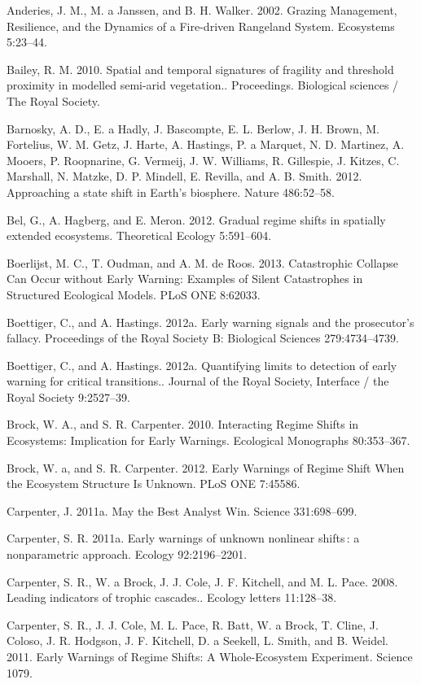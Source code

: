 \documentclass{article}
\begin{document}
Anderies, J. M., M. a Janssen, and B. H. Walker. 2002. Grazing
Management, Resilience, and the Dynamics of a Fire-driven Rangeland
System. Ecosystems 5:23--44.

Bailey, R. M. 2010. Spatial and temporal signatures of fragility and
threshold proximity in modelled semi-arid vegetation.. Proceedings.
Biological sciences / The Royal Society.

Barnosky, A. D., E. a Hadly, J. Bascompte, E. L. Berlow, J. H. Brown, M.
Fortelius, W. M. Getz, J. Harte, A. Hastings, P. a Marquet, N. D.
Martinez, A. Mooers, P. Roopnarine, G. Vermeij, J. W. Williams, R.
Gillespie, J. Kitzes, C. Marshall, N. Matzke, D. P. Mindell, E. Revilla,
and A. B. Smith. 2012. Approaching a state shift in Earth's biosphere.
Nature 486:52--58.

Bel, G., A. Hagberg, and E. Meron. 2012. Gradual regime shifts in
spatially extended ecosystems. Theoretical Ecology 5:591--604.

Boerlijst, M. C., T. Oudman, and A. M. de Roos. 2013. Catastrophic
Collapse Can Occur without Early Warning: Examples of Silent
Catastrophes in Structured Ecological Models. PLoS ONE 8:62033.

Boettiger, C., and A. Hastings. 2012a. Early warning signals and the
prosecutor's fallacy. Proceedings of the Royal Society B: Biological
Sciences 279:4734--4739.

Boettiger, C., and A. Hastings. 2012a. Quantifying limits to detection
of early warning for critical transitions.. Journal of the Royal
Society, Interface / the Royal Society 9:2527--39.

Brock, W. A., and S. R. Carpenter. 2010. Interacting Regime Shifts in
Ecosystems: Implication for Early Warnings. Ecological Monographs
80:353--367.

Brock, W. a, and S. R. Carpenter. 2012. Early Warnings of Regime Shift
When the Ecosystem Structure Is Unknown. PLoS ONE 7:45586.

Carpenter, J. 2011a. May the Best Analyst Win. Science 331:698--699.

Carpenter, S. R. 2011a. Early warnings of unknown nonlinear shifts : a
nonparametric approach. Ecology 92:2196--2201.

Carpenter, S. R., W. a Brock, J. J. Cole, J. F. Kitchell, and M. L.
Pace. 2008. Leading indicators of trophic cascades.. Ecology letters
11:128--38.

Carpenter, S. R., J. J. Cole, M. L. Pace, R. Batt, W. a Brock, T. Cline,
J. Coloso, J. R. Hodgson, J. F. Kitchell, D. a Seekell, L. Smith, and B.
Weidel. 2011. Early Warnings of Regime Shifts: A Whole-Ecosystem
Experiment. Science 1079.
\end{document}
